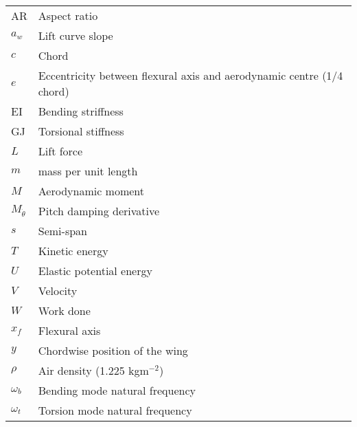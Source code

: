 \documentclass{standalone}
\begin{document}
    \begin{tabular}{l l}
     AR & Aspect ratio \\
     $a_w$ & Lift curve slope\\
     $c$& Chord\\
     $e$ & Eccentricity between flexural axis and aerodynamic centre (1/4 chord)\\
     EI & Bending striffness\\
     GJ & Torsional stiffness\\
     $L$ & Lift force\\
     $m$ & mass per unit length\\
     $M$ & Aerodynamic moment\\
     $M_{\dot{\theta}}$ & Pitch damping derivative\\
     $s$ & Semi-span\\
     $T$ & Kinetic energy\\
     $U$ & Elastic potential energy\\
     $V$ & Velocity\\
     $W$ & Work done\\
     $x_f$ & Flexural axis\\
     $y$ & Chordwise position of the wing\\
     $\rho$ & Air density (1.225 kgm$^{-2}$)\\
     $\omega_b$ & Bending mode natural frequency\\
     $\omega_t$ & Torsion mode natural frequency\\
     
     
    \end{tabular}
    
\end{document}
